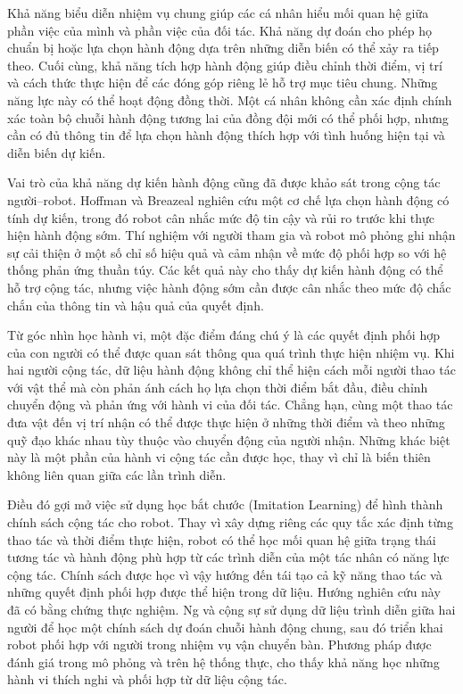Khả năng biểu diễn nhiệm vụ chung giúp các cá nhân hiểu mối quan hệ giữa phần việc của mình và phần việc của đối tác. Khả năng dự đoán cho phép họ chuẩn bị hoặc lựa chọn hành động dựa trên những diễn biến có thể xảy ra tiếp theo. Cuối cùng, khả năng tích hợp hành động giúp điều chỉnh thời điểm, vị trí và cách thức thực hiện để các đóng góp riêng lẻ hỗ trợ mục tiêu chung. Những năng lực này có thể hoạt động đồng thời. Một cá nhân không cần xác định chính xác toàn bộ chuỗi hành động tương lai của đồng đội mới có thể phối hợp, nhưng cần có đủ thông tin để lựa chọn hành động thích hợp với tình huống hiện tại và diễn biến dự kiến.

Vai trò của khả năng dự kiến hành động cũng đã được khảo sát trong cộng tác người--robot. Hoffman và Breazeal \cite{hoffman2007effectsofanticipatoryaction} nghiên cứu một cơ chế lựa chọn hành động có tính dự kiến, trong đó robot cân nhắc mức độ tin cậy và rủi ro trước khi thực hiện hành động sớm. Thí nghiệm với người tham gia và robot mô phỏng ghi nhận sự cải thiện ở một số chỉ số hiệu quả và cảm nhận về mức độ phối hợp so với hệ thống phản ứng thuần túy. Các kết quả này cho thấy dự kiến hành động có thể hỗ trợ cộng tác, nhưng việc hành động sớm cần được cân nhắc theo mức độ chắc chắn của thông tin và hậu quả của quyết định.

Từ góc nhìn học hành vi, một đặc điểm đáng chú ý là các quyết định phối hợp của con người có thể được quan sát thông qua quá trình thực hiện nhiệm vụ. Khi hai người cộng tác, dữ liệu hành động không chỉ thể hiện cách mỗi người thao tác với vật thể mà còn phản ánh cách họ lựa chọn thời điểm bắt đầu, điều chỉnh chuyển động và phản ứng với hành vi của đối tác. Chẳng hạn, cùng một thao tác đưa vật đến vị trí nhận có thể được thực hiện ở những thời điểm và theo những quỹ đạo khác nhau tùy thuộc vào chuyển động của người nhận. Những khác biệt này là một phần của hành vi cộng tác cần được học, thay vì chỉ là biến thiên không liên quan giữa các lần trình diễn.

Điều đó gợi mở việc sử dụng học bắt chước (Imitation Learning) để hình thành chính sách cộng tác cho robot. Thay vì xây dựng riêng các quy tắc xác định từng thao tác và thời điểm thực hiện, robot có thể học mối quan hệ giữa trạng thái tương tác và hành động phù hợp từ các trình diễn của một tác nhân có năng lực cộng tác. Chính sách được học vì vậy hướng đến tái tạo cả kỹ năng thao tác và những quyết định phối hợp được thể hiện trong dữ liệu. Hướng nghiên cứu này đã có bằng chứng thực nghiệm. Ng và cộng sự \cite{ng2024diffusioncopolicy} sử dụng dữ liệu trình diễn giữa hai người để học một chính sách dự đoán chuỗi hành động chung, sau đó triển khai robot phối hợp với người trong nhiệm vụ vận chuyển bàn. Phương pháp được đánh giá trong mô phỏng và trên hệ thống thực, cho thấy khả năng học những hành vi thích nghi và phối hợp từ dữ liệu cộng tác.

